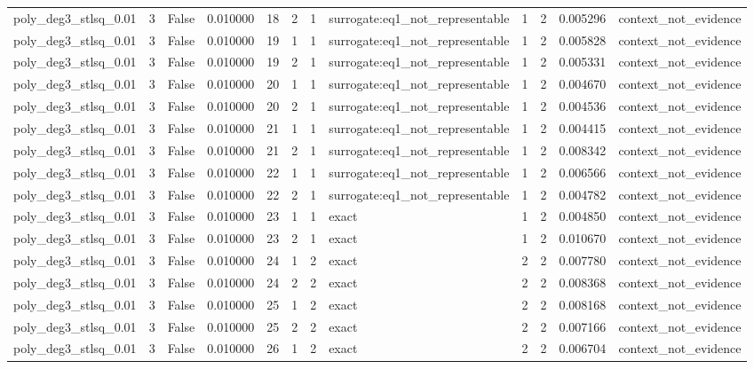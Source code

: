\begin{tabular}{lrrrrrrlrrrl}
poly\_deg3\_stlsq\_0.01 & 3 & False & 0.010000 & 18 & 2 & 1 & surrogate:eq1\_not\_representable & 1 & 2 & 0.005296 & context\_not\_evidence \\
poly\_deg3\_stlsq\_0.01 & 3 & False & 0.010000 & 19 & 1 & 1 & surrogate:eq1\_not\_representable & 1 & 2 & 0.005828 & context\_not\_evidence \\
poly\_deg3\_stlsq\_0.01 & 3 & False & 0.010000 & 19 & 2 & 1 & surrogate:eq1\_not\_representable & 1 & 2 & 0.005331 & context\_not\_evidence \\
poly\_deg3\_stlsq\_0.01 & 3 & False & 0.010000 & 20 & 1 & 1 & surrogate:eq1\_not\_representable & 1 & 2 & 0.004670 & context\_not\_evidence \\
poly\_deg3\_stlsq\_0.01 & 3 & False & 0.010000 & 20 & 2 & 1 & surrogate:eq1\_not\_representable & 1 & 2 & 0.004536 & context\_not\_evidence \\
poly\_deg3\_stlsq\_0.01 & 3 & False & 0.010000 & 21 & 1 & 1 & surrogate:eq1\_not\_representable & 1 & 2 & 0.004415 & context\_not\_evidence \\
poly\_deg3\_stlsq\_0.01 & 3 & False & 0.010000 & 21 & 2 & 1 & surrogate:eq1\_not\_representable & 1 & 2 & 0.008342 & context\_not\_evidence \\
poly\_deg3\_stlsq\_0.01 & 3 & False & 0.010000 & 22 & 1 & 1 & surrogate:eq1\_not\_representable & 1 & 2 & 0.006566 & context\_not\_evidence \\
poly\_deg3\_stlsq\_0.01 & 3 & False & 0.010000 & 22 & 2 & 1 & surrogate:eq1\_not\_representable & 1 & 2 & 0.004782 & context\_not\_evidence \\
poly\_deg3\_stlsq\_0.01 & 3 & False & 0.010000 & 23 & 1 & 1 & exact & 1 & 2 & 0.004850 & context\_not\_evidence \\
poly\_deg3\_stlsq\_0.01 & 3 & False & 0.010000 & 23 & 2 & 1 & exact & 1 & 2 & 0.010670 & context\_not\_evidence \\
poly\_deg3\_stlsq\_0.01 & 3 & False & 0.010000 & 24 & 1 & 2 & exact & 2 & 2 & 0.007780 & context\_not\_evidence \\
poly\_deg3\_stlsq\_0.01 & 3 & False & 0.010000 & 24 & 2 & 2 & exact & 2 & 2 & 0.008368 & context\_not\_evidence \\
poly\_deg3\_stlsq\_0.01 & 3 & False & 0.010000 & 25 & 1 & 2 & exact & 2 & 2 & 0.008168 & context\_not\_evidence \\
poly\_deg3\_stlsq\_0.01 & 3 & False & 0.010000 & 25 & 2 & 2 & exact & 2 & 2 & 0.007166 & context\_not\_evidence \\
poly\_deg3\_stlsq\_0.01 & 3 & False & 0.010000 & 26 & 1 & 2 & exact & 2 & 2 & 0.006704 & context\_not\_evidence \\

\end{tabular}
